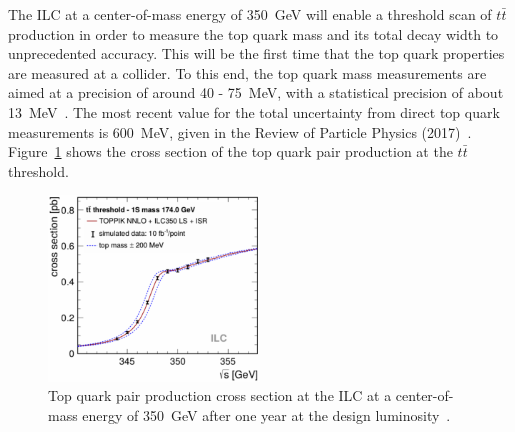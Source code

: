 The ILC at a center-of-mass energy of \SI{350}{\GeV} will enable a threshold scan of $t\bar{t}$ production in order to measure the top quark mass and its total decay width to unprecedented accuracy.
This will be the first time that the top quark properties are measured at a \positron\electron collider. 
To this end, the top quark mass measurements are aimed at a precision of around 40 - \SI{75}{\MeV}, with a statistical precision of about \SI{13}{\MeV}~\cite[p. 24]{ILC_Discovery}.
The most recent value for the total uncertainty from direct top quark measurements is \SI{600}{\MeV}, given in the Review of Particle Physics (2017)~\cite{PDG2017}.
Figure~\ref{fig:Top_cross} shows the cross section of the top quark pair production at the $t\bar{t}$ threshold.
\begin{figure}[!h]
\centering
\includegraphics[width=0.5\textwidth]{Figures/Top_mass.pdf}
\caption[Top quark pair production cross section]{Top quark pair production cross section at the ILC at a center-of-mass energy of \SI{350}{\GeV} after one year at the design luminosity~\cite[p. 15]{ILCPhysics}.}
\label{fig:Top_cross}
\end{figure}

